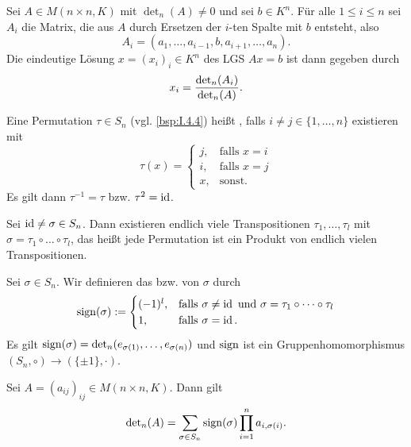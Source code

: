 \setcounter{definition}{7}
\begin{satz}
	\label{satz:I.14.8}
	Sei $A \in M(n \times n,K)$ mit $\det_n(A) \neq 0$ und sei $b \in K^n$.
	Für alle $1 \leq i \leq n$ sei $A_i$ die Matrix, die aus $A$ durch Ersetzen der $i$-ten Spalte mit $b$ entsteht, also
	\[
		A_i = (a_1,\dots,a_{i-1},b,a_{i+1},\dots,a_n).
	\]
	Die eindeutige Lösung $x = (x_i)_i \in K^n$ des LGS $Ax = b$ ist dann gegeben durch
	\[
		x_i = \frac{\operatorname{\det\,\!}_n(A_i)}{\operatorname{\det\,\!}_n(A)}.
	\]
\end{satz}

\setcounter{definition}{9}
\begin{definition}[Transposition]
	\label{def:I.14.10}
	Eine Permutation $\tau \in S_n$ (vgl. \autoref{bsp:I.4.4}) heißt , falls $i \neq j \in \{1,\dots,n\}$ existieren mit
	\[
		\tau(x) = \begin{cases}
			j, & \text{falls } x = i \\
			i, & \text{falls } x = j \\
			x, & \text{sonst.}
		\end{cases}
	\]
	Es gilt dann $\tau^{-1} = \tau$ bzw. $\tau^2 = \operatorname{id}$.
\end{definition}

\begin{lemma}
	\label{lemma:I.14.11}
	Sei $\operatorname{id} \neq \sigma \in S_n$.
	Dann existieren endlich viele Transpositionen $\tau_1,\dots,\tau_l$ mit $\sigma = \tau_1 \circ \dots \circ \tau_l$, das heißt jede Permutation ist ein Produkt von endlich vielen Transpositionen.
\end{lemma}

\setcounter{definition}{12}
\begin{definition}[Signum]
	\label{def:I.14.13}
	Sei $\sigma \in S_n$.
	Wir definieren das  bzw.  von $\sigma$ durch
	\[
		\operatorname{sign}(\sigma) := \begin{cases}
			(-1)^l, & \text{falls } \sigma \neq \operatorname{id} \text{ und } \sigma = \tau_1 \circ \dots \circ \tau_l \\
			1, & \text{falls } \sigma = \operatorname{id}.
		\end{cases}
	\]
	Es gilt $\operatorname{sign}(\sigma) = \operatorname{\det\,\!}_n(e_{\sigma(1)},\dots,e_{\sigma(n)})$ und $\operatorname{sign}$ ist ein Gruppenhomomorphismus $(S_n,\circ) \rightarrow(\{\pm 1\},\cdot)$.
\end{definition}

\setcounter{definition}{14}
\begin{satz}
	\label{satz:I.14.15}
	Sei $A = (a_{ij})_{ij} \in M(n \times n,K)$.
	Dann gilt 
	\[
		\operatorname{\det\,\!}_n(A) = \sum_{\sigma \in S_n}^{} \operatorname{sign}(\sigma) \prod_{i=1}^{n} a_{i,\sigma(i)}.
	\]
\end{satz}